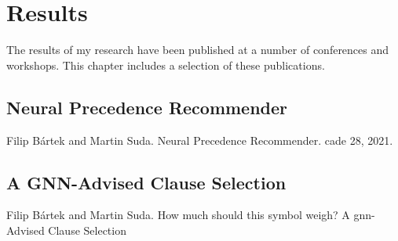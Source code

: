 \chapter{Results}

The results of my research have been published at a number of conferences and workshops.
This chapter includes a selection of these publications.

%


\section{Neural Precedence Recommender}
\label{sec:results:npr}

Filip Bártek and Martin Suda. Neural Precedence Recommender. \Gls{cade} 28, 2021. \cite{DBLP:conf/cade/Bartek021}



\section{A GNN-Advised Clause Selection}
\label{sec:results:selection}

Filip Bártek and Martin Suda. How much should this symbol weigh? A \acrshort{gnn}-Advised Clause Selection \cite{DBLP:conf/lpar/Bartek023}



